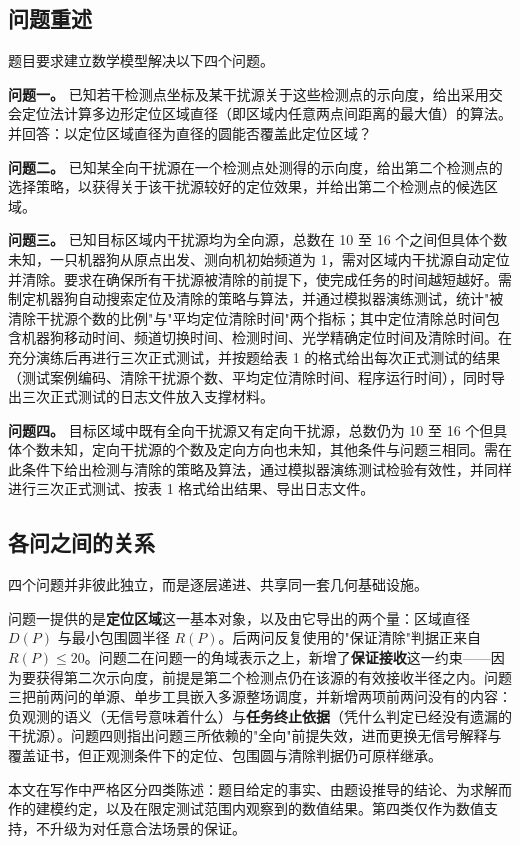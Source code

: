 \subsection{问题重述}

题目要求建立数学模型解决以下四个问题。

\textbf{问题一。} 已知若干检测点坐标及某干扰源关于这些检测点的示向度，给出采用交会定位法计算多边形定位区域直径（即区域内任意两点间距离的最大值）的算法。并回答：以定位区域直径为直径的圆能否覆盖此定位区域？

\textbf{问题二。} 已知某全向干扰源在一个检测点处测得的示向度，给出第二个检测点的选择策略，以获得关于该干扰源较好的定位效果，并给出第二个检测点的候选区域。

\textbf{问题三。} 已知目标区域内干扰源均为全向源，总数在 10 至 16 个之间但具体个数未知，一只机器狗从原点出发、测向机初始频道为 1，需对区域内干扰源自动定位并清除。要求在确保所有干扰源被清除的前提下，使完成任务的时间越短越好。需制定机器狗自动搜索定位及清除的策略与算法，并通过模拟器演练测试，统计"被清除干扰源个数的比例"与"平均定位清除时间"两个指标；其中定位清除总时间包含机器狗移动时间、频道切换时间、检测时间、光学精确定位时间及清除时间。在充分演练后再进行三次正式测试，并按题给表 1 的格式给出每次正式测试的结果（测试案例编码、清除干扰源个数、平均定位清除时间、程序运行时间），同时导出三次正式测试的日志文件放入支撑材料。

\textbf{问题四。} 目标区域中既有全向干扰源又有定向干扰源，总数仍为 10 至 16 个但具体个数未知，定向干扰源的个数及定向方向也未知，其他条件与问题三相同。需在此条件下给出检测与清除的策略及算法，通过模拟器演练测试检验有效性，并同样进行三次正式测试、按表 1 格式给出结果、导出日志文件。

\subsection{各问之间的关系}

四个问题并非彼此独立，而是逐层递进、共享同一套几何基础设施。

问题一提供的是\textbf{定位区域}这一基本对象，以及由它导出的两个量：区域直径 $D(P)$ 与最小包围圆半径 $R(P)$。后两问反复使用的"保证清除"判据正来自 $R(P)\le20$。问题二在问题一的角域表示之上，新增了\textbf{保证接收}这一约束——因为要获得第二次示向度，前提是第二个检测点仍在该源的有效接收半径之内。问题三把前两问的单源、单步工具嵌入多源整场调度，并新增两项前两问没有的内容：负观测的语义（无信号意味着什么）与\textbf{任务终止依据}（凭什么判定已经没有遗漏的干扰源）。问题四则指出问题三所依赖的"全向"前提失效，进而更换无信号解释与覆盖证书，但正观测条件下的定位、包围圆与清除判据仍可原样继承。

本文在写作中严格区分四类陈述：题目给定的事实、由题设推导的结论、为求解而作的建模约定，以及在限定测试范围内观察到的数值结果。第四类仅作为数值支持，不升级为对任意合法场景的保证。
